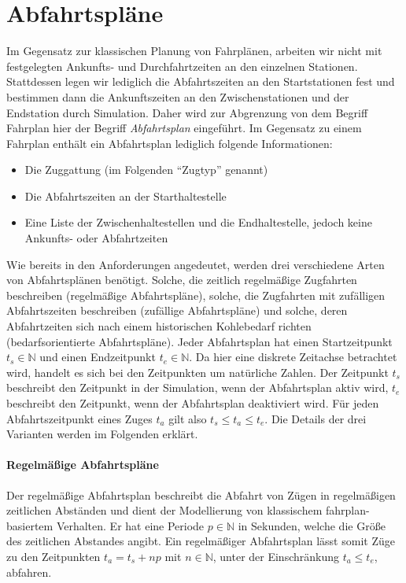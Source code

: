 \section{Abfahrtspläne}

Im Gegensatz zur klassischen Planung von Fahrplänen, arbeiten wir nicht mit festgelegten Ankunfts- und Durchfahrtzeiten an den einzelnen Stationen. Stattdessen legen wir lediglich die Abfahrtszeiten an den Startstationen fest und bestimmen dann die Ankunftszeiten an den Zwischenstationen und der Endstation durch Simulation. Daher wird zur Abgrenzung von dem Begriff Fahrplan hier der Begriff \emph{Abfahrtsplan} eingeführt. Im Gegensatz zu einem Fahrplan enthält ein Abfahrtsplan lediglich folgende Informationen:
\begin{itemize}
    \item Die Zuggattung (im Folgenden \enquote{Zugtyp} genannt)
    \item Die Abfahrtszeiten an der Starthaltestelle
    \item Eine Liste der Zwischenhaltestellen und die Endhaltestelle, jedoch keine Ankunfts- oder Abfahrtzeiten
\end{itemize}
 Wie bereits in den Anforderungen angedeutet, werden drei verschiedene Arten von Abfahrtsplänen benötigt. Solche, die zeitlich regelmäßige Zugfahrten beschreiben (regelmäßige Abfahrtspläne), solche, die Zugfahrten mit zufälligen Abfahrtszeiten beschreiben (zufällige Abfahrtspläne) und solche, deren Abfahrtzeiten sich nach einem historischen Kohlebedarf richten (bedarfsorientierte Abfahrtspläne). Jeder Abfahrtsplan hat einen Startzeitpunkt $t_s \in \mathbb{N}$ und einen Endzeitpunkt $t_e \in \mathbb{N}$. Da hier eine diskrete Zeitachse betrachtet wird, handelt es sich bei den Zeitpunkten um natürliche Zahlen. Der Zeitpunkt $t_s$ beschreibt den Zeitpunkt in der Simulation, wenn der Abfahrtsplan aktiv wird, $t_e$ beschreibt den Zeitpunkt, wenn der Abfahrtsplan deaktiviert wird. Für jeden Abfahrtszeitpunkt eines Zuges $t_a$ gilt also $t_s\leq t_a \leq t_e$. Die Details der drei Varianten werden im Folgenden erklärt.

\paragraph*{Regelmäßige Abfahrtspläne}

Der regelmäßige Abfahrtsplan beschreibt die Abfahrt von Zügen in regelmäßigen zeitlichen Abständen und dient der Modellierung von klassischem fahrplan-basiertem Verhalten. Er hat eine Periode $p\in\mathbb{N}$ in Sekunden, welche die Größe des zeitlichen Abstandes angibt. Ein regelmäßiger Abfahrtsplan lässt somit Züge zu den Zeitpunkten $t_a=t_s+np$ mit $n\in\mathbb{N}$, unter der Einschränkung $t_a\leq t_e$, abfahren.

